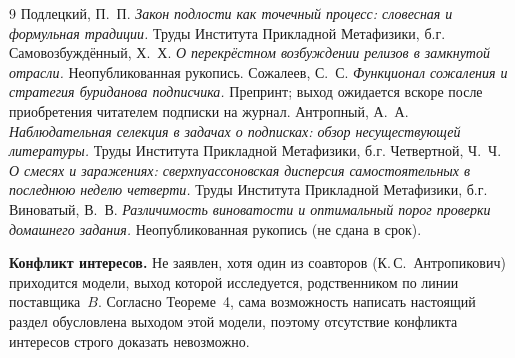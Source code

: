 \documentclass[11pt,a4paper]{article}
\begin{document}
\begin{thebibliography}{9}
 Подлецкий, П.~П. \textit{Закон подлости как точечный процесс: словесная и формульная традиции.} Труды Института Прикладной Метафизики, б.г.
 Самовозбуждённый, Х.~Х. \textit{О перекрёстном возбуждении релизов в замкнутой отрасли.} Неопубликованная рукопись.
 Сожалеев, С.~С. \textit{Функционал сожаления и стратегия буриданова подписчика.} Препринт; выход ожидается вскоре после приобретения читателем подписки на журнал.
 Антропный, А.~А. \textit{Наблюдательная селекция в задачах о подписках: обзор несуществующей литературы.} Труды Института Прикладной Метафизики, б.г.
 Четвертной, Ч.~Ч. \textit{О смесях и заражениях: сверхпуассоновская дисперсия самостоятельных в последнюю неделю четверти.} Труды Института Прикладной Метафизики, б.г.
 Виноватый, В.~В. \textit{Различимость виноватости и оптимальный порог проверки домашнего задания.} Неопубликованная рукопись (не сдана в срок).
\end{thebibliography}

\noindent\textbf{Конфликт интересов.} Не заявлен, хотя один из соавторов (К.\,С.~Антропикович) приходится модели, выход которой исследуется, родственником по линии поставщика~$B$. Согласно Теореме~4, сама возможность написать настоящий раздел обусловлена выходом этой модели, поэтому отсутствие конфликта интересов строго доказать невозможно.
\end{document}
